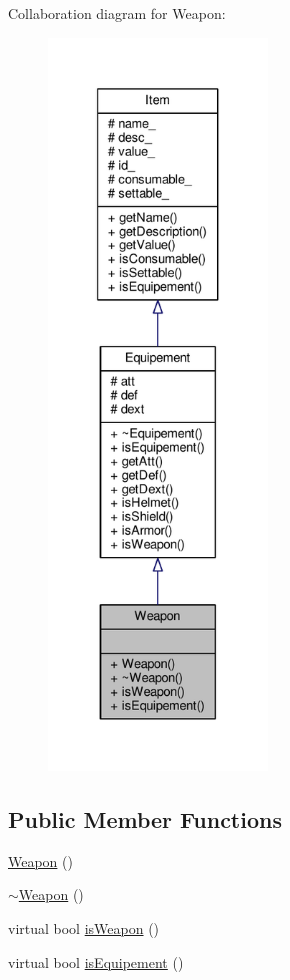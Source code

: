 Collaboration diagram for Weapon\-:\nopagebreak
\begin{figure}[H]
\begin{center}
\leavevmode
\includegraphics[height=550pt]{class_weapon__coll__graph}
\end{center}
\end{figure}
\subsection*{Public Member Functions}
\begin{DoxyCompactItemize}
\item 
\hyperlink{class_weapon_a42dbc46dd70319a24763992c4ebbd396}{Weapon} ()
\item 
\hyperlink{class_weapon_a420e7ba3d2017e6de3e93eb579cfd3fa}{$\sim$\-Weapon} ()
\item 
virtual bool \hyperlink{class_weapon_ae5642871fb846d4121e000f1498ea5b8}{is\-Weapon} ()
\item 
virtual bool \hyperlink{class_weapon_a2e0e8d9fa16888c7a363ef736940c2bd}{is\-Equipement} ()
\end{DoxyCompactItemize}
